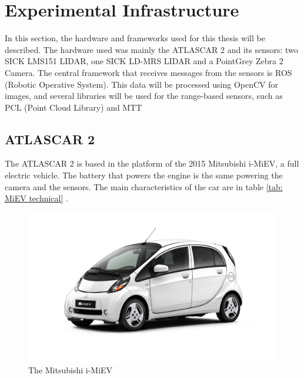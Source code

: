 \chapter{Experimental Infrastructure}

In this section, the hardware and frameworks used for this thesis will be described. The hardware used was mainly the ATLASCAR 2 and its sensors: two SICK LMS151 LIDAR, one SICK LD-MRS LIDAR and a PointGrey Zebra 2 Camera. The central framework that receives messages from the sensors is ROS (Robotic Operative System). This data will be processed using OpenCV for images, and several libraries will be used for the range-based sensors, such as PCL (Point Cloud Library) and MTT 

\section{ATLASCAR 2}

The ATLASCAR 2 is based in the platform of the 2015 Mitsubishi i-MiEV, a full electric vehicle. The battery that powers the engine is the same powering the camera and the sensors. The main characteristics of the car are in table \ref{tab: MiEV technical} \cite{MITSUBISHIMOTORS}. 

\begin{figure}[htp]
	
	\centering
	\includegraphics[width=.9\textwidth]{capexp/imgs/imiev}\hfill
	
	\caption{The Mitsubishi i-MiEV}
	\label{fig:imiev}
	
\end{figure}

